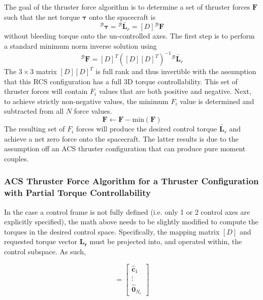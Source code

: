The goal of the thruster force algorithm is to determine a set of thruster forces $\bm F$ such that the net torque $\bm \tau$ onto the spacecraft is
\begin{equation}
	\label{eq:th:2}
	{}^{\mathcal{B}}\bm\tau = {}^{\mathcal{B}}\bar{\bm L}_{r}  = [D]{}^{\mathcal{B}}\bm F
\end{equation}
without bleeding torque onto the un-controlled axes.  The first step is to perform a standard minimum norm inverse solution using
\begin{equation}
	\label{eq:th:min}
	{}^{\mathcal{B}}\bm F = [D]^{T}([D][D]^{T})^{-1} {}^{\mathcal{B}}\bar{\bm L}_{r}
\end{equation}
The $3\times 3$ matrix $[D][D]^{T}$ is full rank and thus invertible with the assumption that this RCS configuration has a full 3D torque controllability.  This set of  thruster forces will contain $F_{i}$ values that are both positive and negative.  Next, to achieve strictly non-negative values, the minimum $F_{i}$ value is determined and subtracted from all $N$ force values.
\begin{equation}
	\bm F \leftarrow \bm F -  \text{min}(\bm F)
\end{equation}
The resulting set of $F_{i}$ forces will produce the desired control torque $\bar{\bm L}_{r}$ and achieve a net zero force onto the spacecraft.  The latter results is due to the assumption off an ACS thruster configuration that can produce pure moment couples.

\subsubsection{ACS Thruster Force Algorithm for a Thruster Configuration with Partial Torque Controllability}

In the case a control frame is not fully defined (i.e. only 1 or 2 control axes are explicitly specified), the math above needs to be slightly modified to compute the torques in the desired control space. Specifically, the mapping matrix $[D]$ and requested torque vector $\mathbf{L_r}$ must be projected into, and operated within, the control subspace. As such,

\begin{equation}
	[C]  = \begin{bmatrix}
		\hat{\bm c}_{1} \\ \vdots \\ \hat{\bm 0}_{N_{c}}
	\end{bmatrix}
\end{equation}

